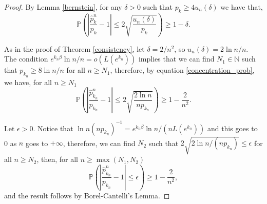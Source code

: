 \documentclass[10pt,a4paper]{amsart}
\newcommand{\N}{\mathbb{N}}
\renewcommand{\P}{\mathbb{P}}
\begin{document}
\begin{proof}
    By Lemma \ref{bernstein}, for any \(\delta>0\) such that \(p_k\geq 4
    u_n\left(\delta\right)\) we have that,
    \begin{equation}\label{concentration_prob}
        \P\left( {\left| {\frac{{\widehat p_k^n}}{{{p_k}}} - 1} \right| \leqslant 2\sqrt {\frac{{{u_n}\left( \delta  \right)}}{{{p_k}}}} } \right) \geqslant 1 - \delta.
    \end{equation}

    As in the proof of Theorem \ref{consistency}, let \(\delta = {2}/{n^2}\), so
    \(u_n(\delta)={2\ln{n}}/{n}\). The condition \(e^{k_n\beta}{\ln{n}}/{n}=o\left(
    {L\left( {{e^{{k_n}}}} \right)} \right)\) implies that we can find \(N_1\in\N\)
    such that \({p_{{k_n}}} \geqslant {{8\ln n}}/{n}\) for all \(n\geq N_1\),
    therefore, by equation \eqref{concentration_prob}, we have, for all $n \geqslant
        {N_1}$
    \begin{equation*}
        \P\left( {\left| {\frac{{\widehat p_{{k_n}}^n}}{{{p_{{k_n}}}}} - 1} \right| \leqslant 2\sqrt {\frac{{2\ln n}}{{n{p_{{k_n}}}}}} } \right) \geqslant 1 - \frac{2}{{{n^2}}}.
    \end{equation*}

    Let \(\epsilon>0\). Notice that \({{\ln n}}{{(n{p_{{k_n}}})^{-1}}} =
    {{{e^{{k_n}\beta }}\ln n }}/{(nL\left( {{e^{{k_n}}}} \right))}\) and this goes to
    0 as $n$ goes to \(+\infty\), therefore, we can find \(N_2\) such that \(2\sqrt
    {{{2\ln n}}/{{(n{p_{{k_n}}})}}} \leqslant \epsilon\) for all \(n\geq N_2\), then,
    for all $n \geqslant \max \left( {{N_1},{N_2}} \right)$
    \begin{equation*}
        \P\left( {\left| {\frac{{\widehat p_{{k_n}}^n}}{{{p_{{k_n}}}}} - 1} \right| \leqslant \epsilon } \right) \geqslant 1 - \frac{2}{{{n^2}}},
    \end{equation*}
    and the result follows by Borel-Cantelli's Lemma.
\end{proof}
\end{document}
